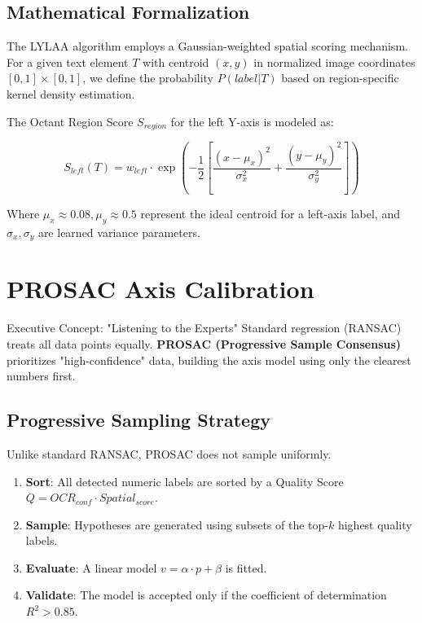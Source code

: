 \documentclass[11pt, a4paper]{report}
\begin{document}
\subsection{Mathematical Formalization}
The LYLAA algorithm employs a Gaussian-weighted spatial scoring mechanism. For a given text element $T$ with centroid $(x, y)$ in normalized image coordinates $[0, 1] \times [0, 1]$, we define the probability $P(label|T)$ based on region-specific kernel density estimation.

The Octant Region Score $S_{region}$ for the left Y-axis is modeled as:

\begin{equation}
    S_{left}(T) = w_{left} \cdot \exp\left( -\frac{1}{2} \left[ \frac{(x - \mu_x)^2}{\sigma_x^2} + \frac{(y - \mu_y)^2}{\sigma_y^2} \right] \right)
\end{equation}

Where $\mu_x \approx 0.08, \mu_y \approx 0.5$ represent the ideal centroid for a left-axis label, and $\sigma_x, \sigma_y$ are learned variance parameters.

\section{PROSAC Axis Calibration}

\begin{conceptbox}{Executive Concept: "Listening to the Experts"}
Standard regression (RANSAC) treats all data points equally. \textbf{PROSAC (Progressive Sample Consensus)} prioritizes "high-confidence" data, building the axis model using only the clearest numbers first.
\end{conceptbox}

\subsection{Progressive Sampling Strategy}
Unlike standard RANSAC, PROSAC does not sample uniformly.
\begin{enumerate}
    \item \textbf{Sort}: All detected numeric labels are sorted by a Quality Score $Q = OCR_{conf} \cdot Spatial_{score}$.
    \item \textbf{Sample}: Hypotheses are generated using subsets of the top-$k$ highest quality labels.
    \item \textbf{Evaluate}: A linear model $v = \alpha \cdot p + \beta$ is fitted.
    \item \textbf{Validate}: The model is accepted only if the coefficient of determination $R^2 > 0.85$.
\end{enumerate}
\end{document}
